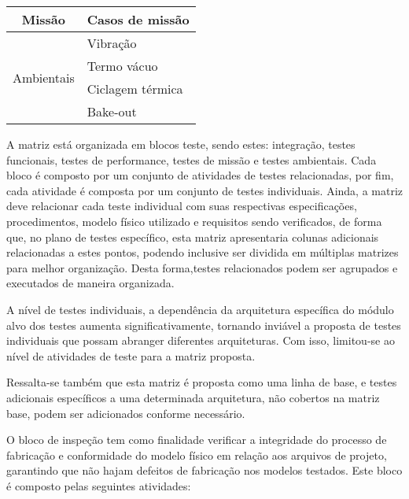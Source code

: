 \begin{table}
\begin{tabular}{cl}
        \midrule
        Missão                          & Casos de missão                       \\
        \midrule
        \multirow{4}{*}{Ambientais}     & Vibração                              \\
                                        & Termo vácuo                           \\
                                        & Ciclagem térmica                      \\
                                        & Bake-out                              \\
        \bottomrule
    \end{tabular}
    \label{tab:matriz-base}
\end{table}


A matriz está organizada em blocos teste, sendo estes: integração, testes funcionais, testes de performance, testes de missão e testes ambientais.
Cada bloco é composto por um conjunto de atividades de testes relacionadas, por fim, cada atividade é composta por um conjunto de testes individuais.
Ainda, a matriz deve relacionar cada teste individual com suas respectivas especificações, procedimentos, modelo físico utilizado e requisitos sendo verificados, de forma que, no plano de testes específico, esta matriz apresentaria colunas adicionais relacionadas a estes pontos, podendo inclusive ser dividida em múltiplas matrizes para melhor organização.
Desta forma,testes relacionados podem ser agrupados e executados de maneira organizada.

A nível de testes individuais, a dependência da arquitetura específica do módulo alvo dos testes aumenta significativamente, tornando inviável a proposta de testes individuais que possam abranger diferentes arquiteturas.
Com isso, limitou-se ao nível de atividades de teste para a matriz proposta.

Ressalta-se também que esta matriz é proposta como uma linha de base, e testes adicionais específicos a uma determinada arquitetura, não cobertos na matriz base, podem ser adicionados conforme necessário.

O bloco de inspeção tem como finalidade verificar a integridade do processo de fabricação e conformidade do modelo físico em relação aos arquivos de projeto, garantindo que não hajam defeitos de fabricação nos modelos testados.
Este bloco é composto pelas seguintes atividades:


